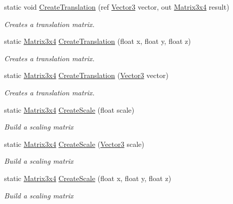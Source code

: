 \begin{DoxyCompactItemize}
static void \hyperlink{struct_open_t_k_1_1_matrix3x4_a3e79c2489b800283b5d8dcd5da3997d4}{Create\-Translation} (ref \hyperlink{struct_open_t_k_1_1_vector3}{Vector3} vector, out \hyperlink{struct_open_t_k_1_1_matrix3x4}{Matrix3x4} result)
\begin{DoxyCompactList}\small\item\em Creates a translation matrix. \end{DoxyCompactList}\item 
static \hyperlink{struct_open_t_k_1_1_matrix3x4}{Matrix3x4} \hyperlink{struct_open_t_k_1_1_matrix3x4_a16ba6288d7b22c810463d9c1bdd4090b}{Create\-Translation} (float x, float y, float z)
\begin{DoxyCompactList}\small\item\em Creates a translation matrix. \end{DoxyCompactList}\item 
static \hyperlink{struct_open_t_k_1_1_matrix3x4}{Matrix3x4} \hyperlink{struct_open_t_k_1_1_matrix3x4_abe20bf3de915383c34a3aea9375a1905}{Create\-Translation} (\hyperlink{struct_open_t_k_1_1_vector3}{Vector3} vector)
\begin{DoxyCompactList}\small\item\em Creates a translation matrix. \end{DoxyCompactList}\item 
static \hyperlink{struct_open_t_k_1_1_matrix3x4}{Matrix3x4} \hyperlink{struct_open_t_k_1_1_matrix3x4_a4940e49b84f90914ddd587a095b1add0}{Create\-Scale} (float scale)
\begin{DoxyCompactList}\small\item\em Build a scaling matrix \end{DoxyCompactList}\item 
static \hyperlink{struct_open_t_k_1_1_matrix3x4}{Matrix3x4} \hyperlink{struct_open_t_k_1_1_matrix3x4_a3a981ca2155f31e4b94176d5df2d5391}{Create\-Scale} (\hyperlink{struct_open_t_k_1_1_vector3}{Vector3} scale)
\begin{DoxyCompactList}\small\item\em Build a scaling matrix \end{DoxyCompactList}\item 
static \hyperlink{struct_open_t_k_1_1_matrix3x4}{Matrix3x4} \hyperlink{struct_open_t_k_1_1_matrix3x4_a7caa62f66115ea772e5b89901bb7b4be}{Create\-Scale} (float x, float y, float z)
\begin{DoxyCompactList}\small\item\em Build a scaling matrix \end{DoxyCompactList}\item 

\end{DoxyCompactItemize}
